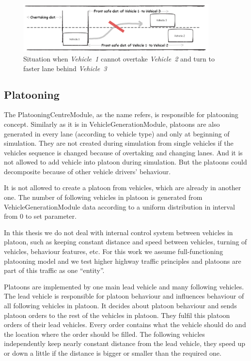 \begin{figure}[ph]
\centering
\includegraphics[width=0.90\textwidth,height=0.90\textheight,keepaspectratio]{figures/Chapter_4/4_cannot_overtake.png}
\centering
\protect\caption{\label{fig:4_2_3_3-7}Situation when \textit{\mbox{Vehicle 1}} cannot overtake \textit{\mbox{Vehicle 2}} and turn to faster lane behind \textit{\mbox{Vehicle 3}}}
\end{figure}

\subsection{Platooning}

The PlatooningCentreModule, as the name refers, is responsible for platooning concept. Similarly as it is in VehicleGenerationModule, platoons are also generated in every lane (according to vehicle type) and only at beginning of simulation. They are not created during simulation from single vehicles if the vehicles sequence is changed because of overtaking and changing lanes. And it is not allowed to add vehicle into platoon during simulation. But the platoons could decomposite because of other vehicle drivers' behaviour.

It is not allowed to create a platoon from vehicles, which are already in another one. The number of following vehicles in platoon is generated from VehicleGenerationModule data according to a uniform distribution in interval from 0 to set parameter.

In this thesis we do not deal with internal control system between vehicles in platoon, such as keeping constant distance and speed between vehicles, turning of vehicles, behaviour features, etc. For this work we assume full-functioning platooning model and we test higher highway traffic principles and platoons are part of this traffic as one “entity”. 

Platoons are implemented by one main lead vehicle and many following vehicles. The lead vehicle is responsible for platoon behaviour and influences behaviour of all following vehicles in platoon. It decides about platoon behaviour and sends platoon orders to the rest of the vehicles in platoon. They fulfil this platoon orders of their lead vehicles. Every order contains what the vehicle should do and the location where the order should be filled. The following vehicles independently keep nearly constant distance from the lead vehicle, they speed up or down a little if the distance is bigger or smaller than the required one.

